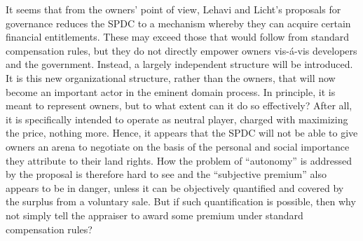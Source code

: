\documentclass[12pt,a4paper]{book} %
\begin{document}
It seems that from the owners' point of view, Lehavi and Licht's proposals for governance reduces the SPDC to a mechanism whereby they can acquire certain financial entitlements. These may exceed those that would follow from standard compensation rules, but they do not directly empower owners vis-{\'a}-vis developers and the government. Instead, a largely independent structure will be introduced. It is this new organizational structure, rather than the owners, that will now become an important actor in the eminent domain process. In principle, it is meant to represent owners, but to what extent can it do so effectively? After all, it is specifically intended to operate as neutral player, charged with maximizing the price, nothing more. Hence, it appears that the SPDC will not be able to give owners an arena to negotiate on the basis of the personal and social importance they attribute to their land rights. How the problem of ``autonomy'' is addressed by the proposal is therefore hard to see and the ``subjective premium'' also appears to be in danger, unless it can be objectively quantified and covered by the surplus from a voluntary sale. But if such quantification is possible, then why not simply tell the appraiser to award some premium under standard compensation rules?
\end{document}
